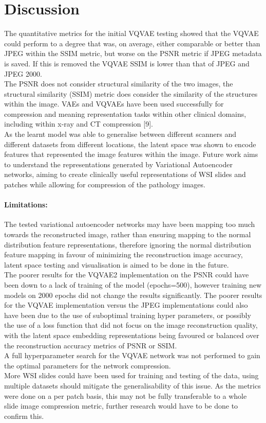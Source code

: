 \documentclass[review]{elsarticle}
\begin{document}
\section{Discussion}
The quantitative metrics for the initial VQVAE testing showed that the VQVAE could perform to a degree that was, on average, either comparable or better than JPEG within the SSIM metric, but worse on the PSNR metric if JPEG metadata is saved. If this is removed the VQVAE SSIM is lower than that of JPEG and JPEG 2000. \\
The PSNR does not consider structural similarity of the two images, the structural similarity (SSIM) metric does consider the similarity of the structures within the image. 
VAEs and VQVAEs have been used successfully for compression and meaning representation tasks within other clinical domains, including within x-ray and CT compression [9]. \\
As the learnt model was able to generalise between different scanners and different datasets from different locations, the latent space was shown to encode features that represented the image features within the image. Future work aims to understand the representations generated by Variational Autoencoder networks, aiming to create clinically useful representations of WSI slides and patches while allowing for compression of the pathology images. \\
\paragraph{Limitations:} The tested variational autoencoder networks may have been mapping too much towards the reconstructed image, rather than ensuring mapping to the normal distribution feature representations, therefore ignoring the normal distribution feature mapping in favour of minimizing the reconstruction image accuracy, latent space testing and visualisation is aimed to be done in the future. \\
The poorer results for the VQVAE2 implementation on the PSNR could have been down to a lack of training of the model (epochs=500), however training new models on 2000 epochs did not change the results significantly. The poorer results for the VQVAE implementation versus the JPEG implementations could also have been due to the use of suboptimal training hyper parameters, or possibly the use of a loss function that did not focus on the image reconstruction quality, with the latent space embedding representations being favoured or balanced over the reconstruction accuracy metrics of PSNR or SSIM. \\
A full hyperparameter search for the VQVAE network was not performed to gain the optimal parameters for the network compression. \\
More WSI slides could have been used for training and testing of the data, using multiple datasets should mitigate the generalisability of this issue. As the metrics were done on a per patch basis, this may not be fully transferable to a whole slide image compression metric, further research would have to be done to confirm this. \\
\end{document}
